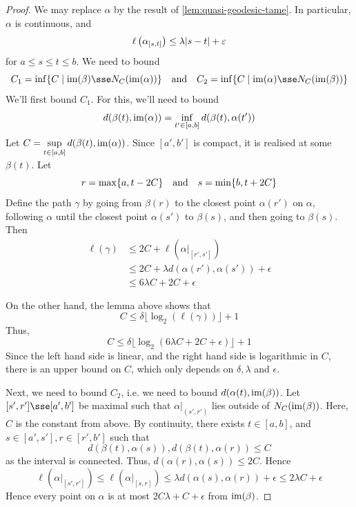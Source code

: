 \documentclass{article}
\begin{document}
\begin{proof}
    We may replace \(\alpha\) by the result of \cref{lem:quasi-geodesic-tame}. In particular, \(\alpha\) is continuous, and
    \[\ell\left(\alpha_{[s, t]}\right) \le \lambda \abs{s - t} + \varepsilon\]
    for \(a \le s \le t \le b\). We need to bound
    \[C_1 = \inf\{C \mid \im(\beta)\sse N_C(\im(\alpha))\} \qqtext{and} C_2 = \inf\{C \mid \im(\alpha) \sse N_C(\im(\beta))\}\]
    We'll first bound \(C_1\). For this, we'll need to bound
    \[d(\beta(t), \operatorname{im}(\alpha)) = \inf_{t' \in [a, b]}d(\beta(t), \alpha(t'))\]
    Let \(C = \sup\limits_{t \in [a, b]}d(\beta(t), \operatorname{im}(\alpha))\). Since \([a', b']\) is compact, it is realised at some \(\beta(t)\). Let
    \[r = \max\{a, t - 2C\} \qqtext{and} s = \min\{b, t + 2C\}\]
    Define the path \(\gamma\) by going from \(\beta(r)\) to the closest point \(\alpha(r')\) on \(\alpha\), following \(\alpha\) until the closest point \(\alpha(s')\) to \(\beta(s)\), and then going to \(\beta(s)\). Then
    \begin{align*}
        \ell(\gamma) &\le 2C + \ell(\alpha\vert_{[r', s']}) \\
        &\le 2C + \lambda d(\alpha(r'), \alpha(s')) + \epsilon \\
        &\le 6\lambda C + 2C + \epsilon
    \end{align*}

    \lec

    On the other hand, the lemma above shows that
    \[C \le \delta\lfloor \log_2(\ell(\gamma))\rfloor + 1\]
    Thus,
    \[C \le \delta\lfloor\log_2(6\lambda C + 2 C + \epsilon)\rfloor + 1\]
    Since the left hand side is linear, and the right hand side is logarithmic in \(C\), there is an upper bound on \(C\), which only depends on \(\delta, \lambda\) and \(\epsilon\).

    Next, we need to bound \(C_2\), i.e. we need to bound \(d(\alpha(t), \operatorname{im}(\beta))\). Let \([s', r'] \sse [a', b']\) be maximal such that \(\alpha \vert_{(s', r')}\) lies outside of \(N_C(\operatorname{im}(\beta))\). Here, \(C\) is the constant from above. By continuity, there exists \(t \in [a, b]\), and \(s \in [a', s'], r \in [r', b']\) such that
    \[d(\beta(t), \alpha(s)), d(\beta(t), \alpha(r)) \le C\]
    as the interval is connected. Thus, \(d(\alpha(r), \alpha(s)) \le 2C\). Hence
    \[\ell(\alpha \vert_{[s', r']}) \le \ell(\alpha\vert_{[s, r]}) \le \lambda d(\alpha(s), \alpha(r)) + \epsilon \le 2\lambda C + \epsilon\]
    Hence every point on \(\alpha\) is at most \(2C \lambda + C + \epsilon\) from \(\operatorname{im}(\beta)\). 
\end{proof}
\end{document}
